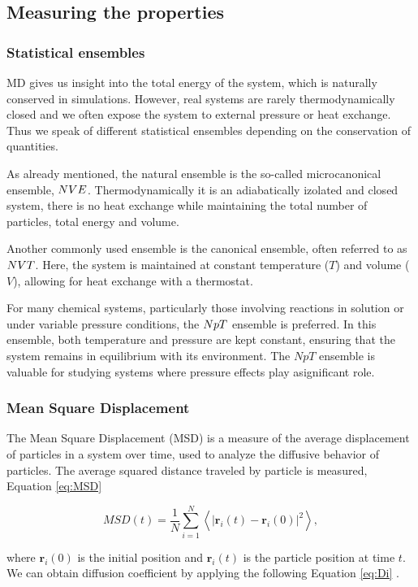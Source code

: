 \subsection{Measuring the properties}
\subsubsection{Statistical ensembles}
MD gives us insight into the total energy of the system, which is naturally conserved in simulations. However, real systems are rarely thermodynamically closed and we often expose the system to external pressure or heat exchange. Thus we speak of different statistical ensembles depending on the conservation of quantities.

As already mentioned, the natural ensemble is the so-called microcanonical ensemble, $\boldmath{NVE}$. Thermodynamically it is an adiabatically izolated and closed system, there is no heat exchange while maintaining the total number of particles, total energy and volume. 

Another commonly used ensemble is the canonical ensemble, often referred to as $\boldmath{NVT}$. Here, the system is maintained at constant temperature ($T$) and volume ($V$), allowing for heat exchange with a thermostat.

For many chemical systems, particularly those involving reactions in solution or under variable pressure conditions, the $\boldmath{NpT}$ ensemble is preferred. In this ensemble, both temperature and pressure are kept constant, ensuring that the system remains in equilibrium with its environment. The $NpT$ ensemble is valuable for studying systems where pressure effects play asignificant role.


\subsubsection{Mean Square Displacement}
The Mean Square Displacement (MSD) is a measure of the average displacement of particles in a system over time, used to analyze the diffusive behavior of particles. The average squared distance traveled by particle is measured, Equation \ref{eq:MSD}

\begin{equation}\label{eq:MSD}
MSD(t) = \frac{1}{N} \sum_{i=1}^{N} \left\langle \left| \mathbf{r}_i(t) - \mathbf{r}_i(0) \right|^2 \right\rangle,
\end{equation}

where $\mathbf{r}_i(0)$ is the initial position and $\mathbf{r}_i(t)$ is the particle position at time $t$. We can obtain diffusion coefficient by applying the following Equation \ref{eq:Di} \cite{braun_best_2019}. 

